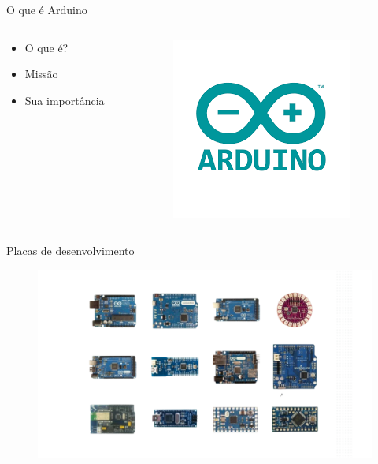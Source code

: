 \documentclass{cubeamer}
\begin{document}
\begin{frame}{O que é Arduino}
    \begin{columns}

        \begin{column}{0.5\textwidth}
            \begin{itemize}
                \item O que é?
                \item Missão
                \item Sua importância
            \end{itemize}
        \end{column}
    
        \centering
        \begin{column}{0.4\textwidth}
            \begin{figure}
                \centering
                \includegraphics[height = 0.6\textheight]{img/arduino.png}
            \end{figure}
        \end{column}
        \centering

    \end{columns}
\end{frame}

\begin{frame}{Placas de desenvolvimento}


    \begin{figure}
        \centering
        \includegraphics[height = 0.9\textheight]{img/placas.png}
    \end{figure}


\end{frame}
\end{document}
